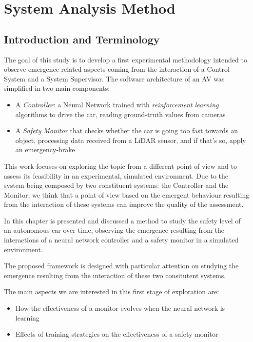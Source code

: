 \chapter{System Analysis Method}

\section{Introduction and Terminology}

The goal of this study is to develop a first experimental methodology intended to observe emergence-related aspects coming from the interaction of a Control System and a System Supervisor.\newline
The software architecture of an AV was simplified in two main components:

\begin{itemize}
	\item A \textsl{Controller}: a Neural Network trained with \textsl{reinforcement learning} algorithms to drive the car, reading ground-truth values from cameras
	\item A \textsl{Safety Monitor} that checks whether the car is going too fast towards an object, processing data received from a LiDAR sensor, and if that's so, apply an emergency-brake
\end{itemize}

This work focuses on exploring the topic from a different point of view and to assess its feasibility in an experimental, simulated environment. Due to the system being composed by two constituent systems: the Controller and the Monitor, we think that a point of view based on the emergent behaviour resulting from the interaction of these systems can improve the quality of the assessment.

In this chapter is presented and discussed a method to study the safety level of an autonomous car over time, observing the emergence resulting from the interactions of a neural network controller and a safety monitor in a simulated environment.

The proposed framework is designed with particular attention on studying the emergence resulting from the interaction of these two consitutent systems.

The main aspects we are interested in this first stage of exploration are:

\begin{itemize}
	\item How the effectiveness of a monitor evolves when the neural network is learning
	\item Effects of training strategies on the effectiveness of a safety monitor
\end{itemize}

